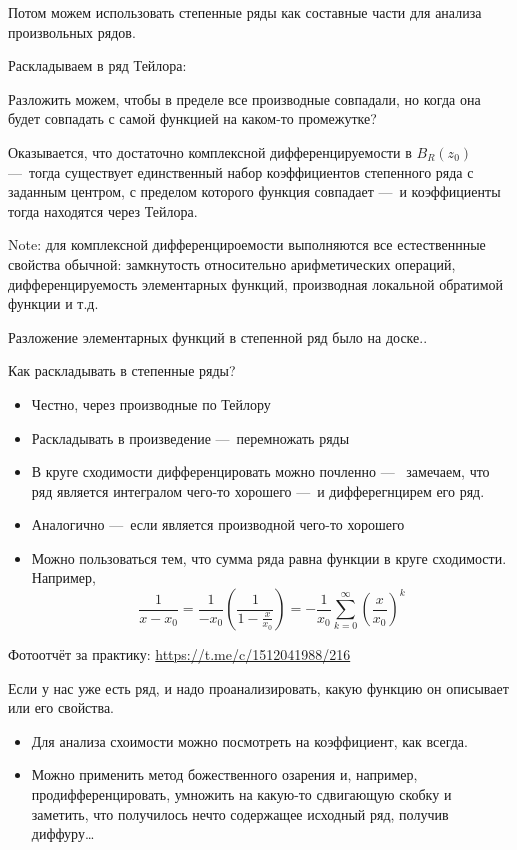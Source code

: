 \documentclass[12pt, a4paper]{article}
\begin{document}
Потом можем использовать степенные ряды как составные части для анализа произвольных рядов.

Раскладываем в ряд Тейлора:

Разложить можем, чтобы в пределе все производные совпадали, но когда она будет совпадать с самой функцией на каком-то промежутке?

Оказывается, что достаточно комплексной дифференцируемости в $B_R(z_0)$ 
— тогда существует единственный набор коэффициентов степенного ряда с заданным центром, 
с пределом которого функция совпадает — и коэффициенты тогда находятся через Тейлора.

Note: для комплексной дифференцироемости выполняются все естественнные свойства обычной: 
замкнутость относительно арифметических операций, дифференцируемость элементарных функций, производная локальной обратимой функции и т.д.

Разложение элементарных функций в степенной ряд было на доске..

Как раскладывать в степенные ряды?

\begin{itemize}
  \item Честно, через производные по Тейлору
  \item Раскладывать в произведение — перемножать ряды
  \item В круге сходимости дифференцировать можно почленно — 
  замечаем, что ряд является интегралом чего-то хорошего — и дифферегнцирем его ряд.
  \item Аналогично — если является производной чего-то хорошего
  \item Можно пользоваться тем, что сумма ряда равна функции в круге сходимости. Например, 
  \begin{equation}
    \frac{1}{x - x_0} = \frac{1}{-x_0}\left(\frac{1}{1-\frac{x}{x_0}}\right) = -\frac{1}{x_0} \sum_{k = 0}^\infty \left(\frac{x}{x_0}\right)^k
  \end{equation}
\end{itemize}



Фотоотчёт за практику: \url{https://t.me/c/1512041988/216}


Если у нас уже есть ряд, и надо проанализировать, какую функцию он описывает или его свойства.

\begin{itemize}
  \item Для анализа схоимости можно посмотреть на коэффициент, как всегда.
  \item Можно применить метод божественного озарения и, например, продифференцировать, умножить на какую-то сдвигающую скобку и заметить, 
  что получилось нечто содержащее исходный ряд, получив диффуру…
\end{itemize}
\end{document}
